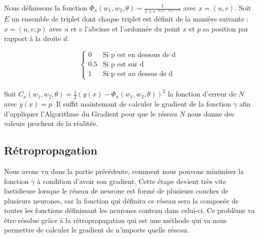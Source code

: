 \documentclass{article}
\begin{document}
Nous défnissons la fonction $\Phi_{x}(w_{1},w_{2},\theta)= \frac{1}{1+e^{-w_{1}u-w_{2}v+\theta}}$ avec $x=(u,v)$.
Soit $E$ un ensemble de triplet dont chaque triplet est définit de la manière suivante : 
$x = (u,v,p)$ 	avec $u$ et $v$ l'abcisse et l'ordonnée du point $x$ et $p$ sa position par rapport à la droite $d$.

	\[ \begin{cases} 0 &\mbox{Si  p est en dessous de d } \\
				 0.5 & \mbox{Si p est sur d } \\
				 1 & \mbox{Si p est au dessus de d }
	 		 \end{cases} \] \\
Soit $ C_x(w_{1},w_{2},\theta) = \frac{1}{2}(y(x)-\Phi_x(w_{1},w_{2},\theta))^{2} $ la fonction d'erreur de $N$ avec $y(x)=p$.
Il suffit maintemant de calculer le gradient de la fonction $\gamma$ afin d'appliquer l'Algorithme du Gradient pour que le réseau $N$ nous donne des valeurs prochent de la réalitée.\\
\newline

\subsection{Rétropropagation}
Nous avons vu dans la partie précédente, comment nous pouvons minimiser la fonction $\gamma$ à condition d'avoir son gradient. Cette étape
devient très vite fastidieuse lorsque le réseau de neurone est formé de plusieurs couches de plusieurs neurones, car la fonction qui
définira ce réseau sera la composée de toutes les fonctions définissant les neurones contenu dans celui-ci. Ce problème va être résolue 
grâce à la rétropropagation qui est une méthode qui va nous permettre de calculer le gradient de n'importe quelle réseau.
\end{document}
